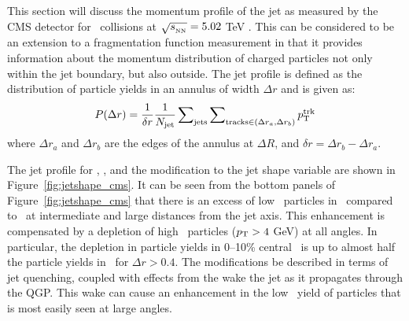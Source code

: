 
This section will discuss the momentum profile of the jet as measured by the CMS detector for \pbpb\ collisions at $\mbox{$\sqrt{s_{_\text{NN}}}$} = 5.02$ TeV \cite{Sirunyan:2018jqr}.
This can be considered to be an extension to a fragmentation function measurement in that it provides information about the momentum distribution of charged particles not only within the jet boundary, but also outside.
The jet profile is defined as the distribution of particle yields in an annulus of width $\Delta r$ and is given as:
\begin{align}
P(\Delta r) = \frac{1}{\delta r} \frac{1}{\mbox{$N_{\mathrm{jet}}$}} \sum\nolimits_{\rm jets}  \sum\nolimits_{{\rm tracks} \in (\Delta r_a, \Delta r_b)} \mbox{$p_{{\mathrm{T}}}^{\mathrm{trk}}$}   
\end{align}
where $\Delta r_a$ and $\Delta r_b$ are the edges of the annulus at $\Delta R$, and $\delta r = \Delta r_b - \Delta r_a$.

The jet profile for \pp, \pbpb, and the modification to the jet shape variable are shown in Figure~\ref{fig:jetshape_cms}.
It can be seen from the bottom panels of Figure~\ref{fig:jetshape_cms} that there is an excess of low \pt\ particles in \pbpb\ compared to \pp\ at intermediate and large distances from the jet axis.
This enhancement is compensated by a depletion of high \pt\ particles ($\mbox{$p_{\mathrm{T}}$} > 4$ GeV) at all angles.
In particular, the depletion in particle yields in 0--10\% central \pbpb\ is up to almost half the particle yields in \pp\ for $\Delta r > 0.4$.
The modifications be described in terms of jet quenching, coupled with effects from the wake the jet as it propagates through the QGP.
This wake can cause an enhancement in the low \pt\ yield of particles that is most easily seen at large angles.

